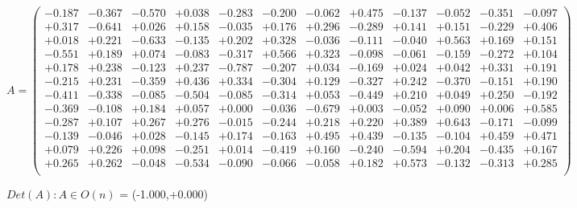 \documentclass[9pt]{article}
\theoremstyle{plain}
\theoremstyle{definition}
\theoremstyle{remark}
\numberwithin{equation}{section}
\begin{document}
$A = \left(
\begin{array}{
cccccccccccc}
-0.187 & -0.367 & -0.570 & +0.038 & -0.283 & -0.200 & -0.062 & +0.475 & -0.137 & -0.052 & -0.351 & -0.097 \\
+0.317 & -0.641 & +0.026 & +0.158 & -0.035 & +0.176 & +0.296 & -0.289 & +0.141 & +0.151 & -0.229 & +0.406 \\
+0.018 & +0.221 & -0.633 & -0.135 & +0.202 & +0.328 & -0.036 & -0.111 & -0.040 & +0.563 & +0.169 & +0.151 \\
-0.551 & +0.189 & +0.074 & -0.083 & -0.317 & +0.566 & +0.323 & -0.098 & -0.061 & -0.159 & -0.272 & +0.104 \\
+0.178 & +0.238 & -0.123 & +0.237 & -0.787 & -0.207 & +0.034 & -0.169 & +0.024 & +0.042 & +0.331 & +0.191 \\
-0.215 & +0.231 & -0.359 & +0.436 & +0.334 & -0.304 & +0.129 & -0.327 & +0.242 & -0.370 & -0.151 & +0.190 \\
-0.411 & -0.338 & -0.085 & -0.504 & -0.085 & -0.314 & +0.053 & -0.449 & +0.210 & +0.049 & +0.250 & -0.192 \\
-0.369 & -0.108 & +0.184 & +0.057 & +0.000 & -0.036 & -0.679 & +0.003 & -0.052 & +0.090 & +0.006 & +0.585 \\
-0.287 & +0.107 & +0.267 & +0.276 & -0.015 & -0.244 & +0.218 & +0.220 & +0.389 & +0.643 & -0.171 & -0.099 \\
-0.139 & -0.046 & +0.028 & -0.145 & +0.174 & -0.163 & +0.495 & +0.439 & -0.135 & -0.104 & +0.459 & +0.471 \\
+0.079 & +0.226 & +0.098 & -0.251 & +0.014 & -0.419 & +0.160 & -0.240 & -0.594 & +0.204 & -0.435 & +0.167 \\
+0.265 & +0.262 & -0.048 & -0.534 & -0.090 & -0.066 & -0.058 & +0.182 & +0.573 & -0.132 & -0.313 & +0.285 \\
\end{array}
\right)$ \newline 

$Det(A) :   A \in O(n)$ = (-1.000,+0.000)
\end{document}
